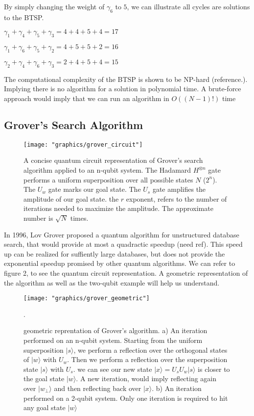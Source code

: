 \documentclass[twocolumn,showpacs,preprintnumbers,amsmath,amssymb]{revtex4}
\begin{document}
		By simply changing the weight of $\gamma_6$ to $5$, we can illustrate all cycles are solutions to the BTSP. 
		
		\begin{center}

			$\gamma_1 + \gamma_4 + \gamma_5 + \gamma_3 = 4 + 4 + 5 + 4 = 17$
			
			$ \gamma_1 + \gamma_6 + \gamma_5 + \gamma_2 = 4 + 5 + 5 + 2 = 16$
			
			$  \gamma_2 + \gamma_4 + \gamma_6 + \gamma_3 = 2 + 4 + 5 + 4 = 15$
		\end{center}
		
		The computational complexity of the BTSP is shown to be NP-hard (reference.). Implying there is no algorithm for a solution in polynomial time. A brute-force approach would imply that we can run an algorithm in $O((N-1)!)$ time
	
		
		\subsection{Grover's Search Algorithm}
		
		\begin{figure}[!h]
			\centering
			\texttt{[image: "graphics/grover\_circuit"]}
			\caption{A concise quantum circuit representation of Grover's search algorithm applied to an n-qubit system. The Hadamard $H^{\otimes n }$ gate performs a uniform superposition over all possible states $N$ ($2^n$). The $U_w$ gate marks our goal state. The $U_s$ gate amplifies the amplitude of our goal state. the $r$ exponent, refers to the number of iterations needed to maximize the amplitude. The approximate number is $\sqrt{N}$ times.}
			\label{fig:grovercircuit}
		\end{figure}
		
		In 1996, Lov Grover proposed a quantum algorithm for unstructured database search, that would provide at most a quadractic speedup (need ref). This speed up can be realized for suffiently large databases, but does not provide the exponential speedup promised by other quantum algorithms. We can refer to figure 2, to see the quantum circuit representation.
		A geometric representation of the algorithm as well as the two-qubit example will help us understand. 
		
		
		\begin{figure}[!h]
			\centering
			\texttt{[image: "graphics/grover\_geometric"]}
			\caption{geometric reprentation of Grover's algorithm.  a) An iteration performed on an n-qubit system.  Starting from the uniform superposition $|s\rangle$, we perform a reflection over the orthogonal states of $|w\rangle$ with $U_w$. Then we perform a reflection over the superposition state $|s\rangle$ with $U_s$. we can see our new state $|x\rangle = U_sU_w|s\rangle$ is closer to the goal state $|w\rangle$. A new iteration, would imply reflecting again over $|w_\perp\rangle$ and then reflecting back over $|x\rangle$. b) An iteration performed on a 2-qubit system. Only one iteration is required to hit any goal state $|w\rangle$ }
			\label{fig:grovergeometric}. 
		\end{figure}
		
\end{document}
